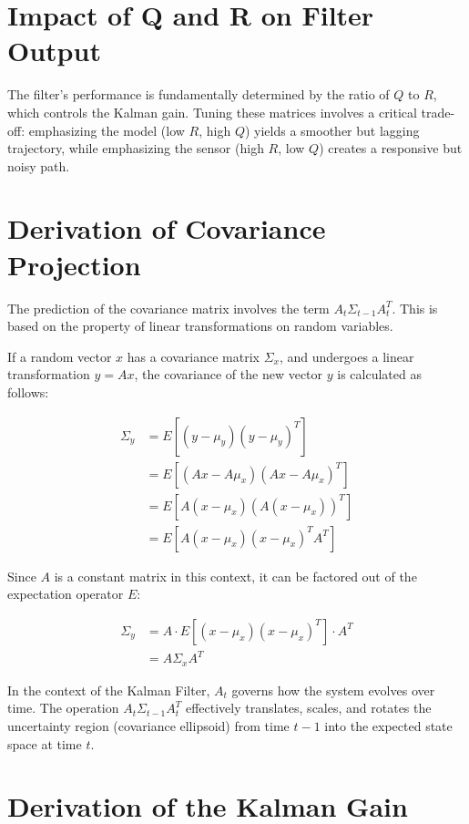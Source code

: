 \documentclass{article}
\begin{document}
\section{Impact of Q and R on Filter Output}

The filter's performance is fundamentally determined by the ratio of $Q$ to $R$, which controls the Kalman gain. Tuning these matrices involves a critical trade-off: emphasizing the model (low $R$, high $Q$) yields a smoother but lagging trajectory, while emphasizing the sensor (high $R$, low $Q$) creates a responsive but noisy path.

\newpage

\appendix
\section{Derivation of Covariance Projection}
\label{sec:appendix_cov}
The prediction of the covariance matrix involves the term $A_t \Sigma_{t-1} A_t^T$. This is based on the property of linear transformations on random variables.

If a random vector $x$ has a covariance matrix $\Sigma_x$, and undergoes a linear transformation $y = A x$, the covariance of the new vector $y$ is calculated as follows:

$$
\begin{aligned}
\Sigma_y &= E[(y - \mu_y)(y - \mu_y)^T] \\
&= E[(A x - A \mu_x)(A x - A \mu_x)^T] \\
&= E[A (x - \mu_x) (A (x - \mu_x))^T] \\
&= E[A (x - \mu_x) (x - \mu_x)^T A^T]
\end{aligned}
$$

Since $A$ is a constant matrix in this context, it can be factored out of the expectation operator $E$:

$$
\begin{aligned}
\Sigma_y &= A \cdot E[(x - \mu_x)(x - \mu_x)^T] \cdot A^T \\
&= A \Sigma_x A^T
\end{aligned}
$$

In the context of the Kalman Filter, $A_t$ governs how the system evolves over time. The operation $A_t \Sigma_{t-1} A_t^T$ effectively translates, scales, and rotates the uncertainty region (covariance ellipsoid) from time $t-1$ into the expected state space at time $t$.

\section{Derivation of the Kalman Gain}
\label{sec:appendix_kalman_gain}
\end{document}
